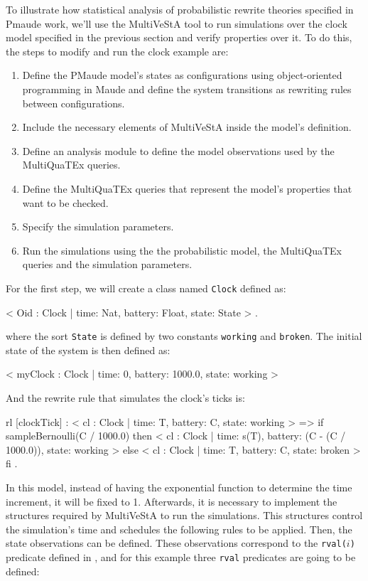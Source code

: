 To illustrate how statistical analysis of probabilistic rewrite theories specified in Pmaude work, we'll use the MultiVeStA tool to run simulations over the clock model specified in the previous section and verify properties over it. To do this, the steps to modify and run the clock example are:
\begin{enumerate}
    \item Define the PMaude model's states as configurations using object-oriented programming in Maude and define the system transitions as rewriting rules between configurations.
    \item Include the necessary elements of MultiVeStA inside the model's definition.
    \item Define an analysis module to define the model observations used by the MultiQuaTEx queries.
    \item Define the MultiQuaTEx queries that represent the model's properties that want to be checked.
    \item Specify the simulation parameters.
    \item Run the simulations using the the probabilistic model, the MultiQuaTEx queries and the simulation parameters.
\end{enumerate} 
For the first step, we will create a class named \texttt{Clock} defined as:
\\
\begin{maude}
< Oid : Clock | time: Nat, battery: Float, state: State > .
\end{maude}
where the sort \texttt{State} is defined by two constants \texttt{working} and \texttt{broken}. The initial state of the system is then defined as:
\\
\begin{maude}
< myClock : Clock  | time: 0, battery: 1000.0, state: working >
\end{maude}
And the rewrite rule that simulates the clock's ticks is:
\\
\begin{maude}
rl [clockTick] :
    < cl : Clock  | time: T, battery: C, state: working > 
  =>
    if sampleBernoulli(C / 1000.0) then
      < cl : Clock  | time: s(T), battery: (C - (C / 1000.0)),
        state: working >
    else
      < cl : Clock  | time: T, battery: C, state: broken >
    fi .
\end{maude}
In this model, instead of having the exponential function to determine the time increment, it will be fixed to 1. Afterwards, it is necessary to implement the structures required by MultiVeStA to run the simulations. This structures control the simulation's time and schedules the following rules to be applied. Then, the state observations can be defined. These observations correspond to the \texttt{rval($i$)} predicate defined in \cite{Agha2006,multivesta}, and for this example three \texttt{rval} predicates are going to be defined:
